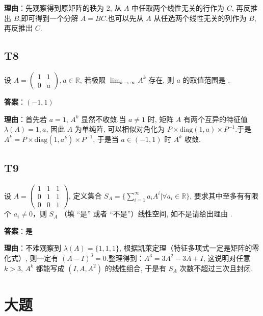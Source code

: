 \documentclass{article}
\begin{document}
\par \textbf{理由}：先观察得到原矩阵的秩为 2, 从 $A$ 中任取两个线性无关的行作为 $C$, 再反推出 $B$,即可得到一个分解 $A=BC$.也可以先从 $A$ 从任选两个线性无关的列作为 $B$, 再反推出 $C$.

\subsection{T8}

\par 设 $A=\begin{pmatrix}
	1 & 1\\
	0 & a
\end{pmatrix}, a\in \mathbb R$, 若极限 $\lim_{k\to \infty}A^k$ 存在, 则 $a$ 的取值范围是 \underline{\phantom{empty\_space}}.

\par \textbf{答案}：$(-1, 1)$

\par \textbf{理由}：首先若 $a=1$, $A^k$ 显然不收敛.当 $a\neq 1$ 时, 矩阵 $A$ 有两个互异的特征值 $\lambda(A)={1, a}$, 因此 $A$ 为单纯阵, 可以相似对角化为 $P\times \text{diag}(1, a)\times P^{-1}$.于是 $A^k=P\times \text{diag}(1, a^k)\times P^{-1}$, 于是当 $a\in(-1, 1)$ 时 $A^k$ 收敛.

\subsection{T9}

\par 设 $A=\begin{pmatrix}
	1 & 1 & 1\\
	0 & 1 & 1\\
	0 & 0 & 1
\end{pmatrix}$, 定义集合 $S_A=\{\sum_{i=1}^\infty a_iA^i|\forall a_i\in \mathbb R\}$, 要求其中至多有有限个 $a_i\neq 0$，则 $S_A$ \underline{\phantom{empty\_space}}（填 “是” 或者 “不是”）线性空间, 如不是请给出理由 \underline{\phantom{empty\_space}} .

\par \textbf{答案}：是

\par \textbf{理由}：不难观察到 $\lambda(A)=\{1, 1, 1\}$, 根据凯莱定理（特征多项式一定是矩阵的零化式）, 则一定有 $(A-I)^3=0$.整理得到：$A^3=3A^2-3A+I$, 这说明对任意 $k>3$, $A^k$ 都能写成 $(I, A, A^2)$ 的线性组合, 于是有 $S_A$ 次数不超过三次且封闭.

\section{大题}
\end{document}
